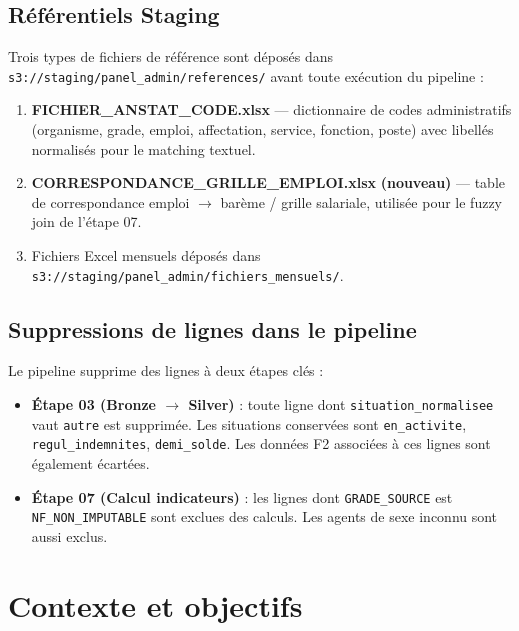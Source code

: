 \documentclass[12pt,a4paper,french]{report}
\newcommand{\bucket}[1]{\texttt{s3://#1}}
\newcommand{\colname}[1]{\texttt{#1}}
\begin{document}
\section{Référentiels Staging}

Trois types de fichiers de référence sont déposés dans
\bucket{staging/panel\_admin/references/} avant toute exécution du pipeline :

\begin{enumerate}
  \item \textbf{FICHIER\_ANSTAT\_CODE.xlsx} — dictionnaire de codes administratifs
        (organisme, grade, emploi, affectation, service, fonction, poste) avec
        libellés normalisés pour le matching textuel.
  \item \textbf{CORRESPONDANCE\_GRILLE\_EMPLOI.xlsx} \textbf{(nouveau)} — table de
        correspondance emploi $\rightarrow$ barème / grille salariale, utilisée pour
        le fuzzy join de l'étape 07.
  \item Fichiers Excel mensuels déposés dans
        \bucket{staging/panel\_admin/fichiers\_mensuels/}.
\end{enumerate}

\section{Suppressions de lignes dans le pipeline}

Le pipeline supprime des lignes à deux étapes clés :

\begin{itemize}
  \item \textbf{Étape 03 (Bronze $\rightarrow$ Silver)} : toute ligne dont
        \colname{situation\_normalisee} vaut \texttt{autre} est supprimée.
        Les situations conservées sont \texttt{en\_activite},
        \texttt{regul\_indemnites}, \texttt{demi\_solde}. Les données F2
        associées à ces lignes sont également écartées.
  \item \textbf{Étape 07 (Calcul indicateurs)} : les lignes dont
        \colname{GRADE\_SOURCE} est \texttt{NF\_NON\_IMPUTABLE} sont exclues
        des calculs. Les agents de sexe inconnu sont aussi exclus.
\end{itemize}

\chapter{Contexte et objectifs}
\end{document}
